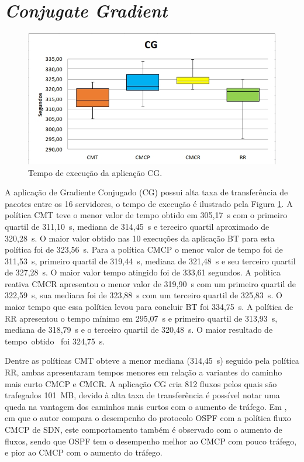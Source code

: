 \section{\textit{Conjugate Gradient}}
\label{sec:cg}

\begin{figure}[!htb]
	\caption{\label{fig:cg}Tempo de execução da aplicação CG.}
	\begin{center}
	    \includegraphics[scale=0.60]{imagens/cg.jpg}
	\end{center}
\end{figure}
A aplicação de Gradiente Conjugado (CG) possui alta taxa de transferência de pacotes entre os 16 servidores, o tempo de execução é ilustrado pela Figura \ref{fig:cg}. A política CMT teve o menor valor de tempo obtido em 305,17~s com o primeiro quartil de 311,10~s, mediana de 314,45~s e terceiro quartil aproximado de 320,28~s. O maior valor obtido nas 10 execuções da aplicação BT para esta política foi de 323,56~s. Para a política CMCP o menor valor de tempo foi de 311,53~s, primeiro quartil de 319,44~s, mediana de 321,48~s e seu terceiro quartil de 327,28~s. O maior valor tempo atingido foi de 333,61 segundos. A política reativa CMCR apresentou o menor valor de 319,90~s com um primeiro quartil de 322,59~s, sua mediana foi de 323,88~s com um terceiro quartil de 325,83~s. O maior tempo que essa política levou para concluir BT foi 334,75~s. A política de RR apresentou o tempo mínimo em 295,07~s e primeiro quartil de 313,93~s, mediana de 318,79~s e o terceiro quartil de 320,48~s. O maior resultado de tempo~obtido~ foi 324,75~s. 

Dentre as políticas CMT obteve a menor mediana (314,45~s) seguido pela política RR, ambas apresentaram tempos menores em relação a variantes do caminho mais curto CMCP e CMCR. A aplicação CG cria 812 fluxos pelos quais são trafegados 101~MB, devido à alta taxa de transferência é possível notar uma queda na vantagem dos caminhos mais curtos com o aumento de tráfego. Em \cite{zhang2015performance}, em que o autor compara o desempenho do protocolo OSPF com a política fluxo CMCP de SDN, este comportamento também é observado com o aumento de fluxos, sendo que OSPF tem o desempenho melhor ao CMCP com pouco tráfego, e pior ao CMCP com o aumento do tráfego.




